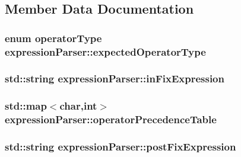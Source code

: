 \subsection{Member Data Documentation}
\hypertarget{classexpression_parser_ab476557dbd05a4340329057317cb5175}{
\subsubsection[{expected\-Operator\-Type}]{\setlength{\rightskip}{0pt plus 5cm}enum {\bf operator\-Type} expression\-Parser\-::expected\-Operator\-Type\hspace{0.3cm}{\ttfamily [private]}}}\label{classexpression_parser_ab476557dbd05a4340329057317cb5175}
\hypertarget{classexpression_parser_a7b5cf82d367f3be9e9430cbbba7a3208}{
\subsubsection[{in\-Fix\-Expression}]{\setlength{\rightskip}{0pt plus 5cm}std\-::string expression\-Parser\-::in\-Fix\-Expression\hspace{0.3cm}{\ttfamily [private]}}}\label{classexpression_parser_a7b5cf82d367f3be9e9430cbbba7a3208}
\hypertarget{classexpression_parser_a7cff5468560616eadf8242d593d7f2fc}{
\subsubsection[{operator\-Precedence\-Table}]{\setlength{\rightskip}{0pt plus 5cm}std\-::map$<$char,int$>$ expression\-Parser\-::operator\-Precedence\-Table\hspace{0.3cm}{\ttfamily [private]}}}\label{classexpression_parser_a7cff5468560616eadf8242d593d7f2fc}
\hypertarget{classexpression_parser_ae954010e5ba9d9ca5b8322f60d55dccc}{
\subsubsection[{post\-Fix\-Expression}]{\setlength{\rightskip}{0pt plus 5cm}std\-::string expression\-Parser\-::post\-Fix\-Expression\hspace{0.3cm}{\ttfamily [private]}}}\label{classexpression_parser_ae954010e5ba9d9ca5b8322f60d55dccc}


